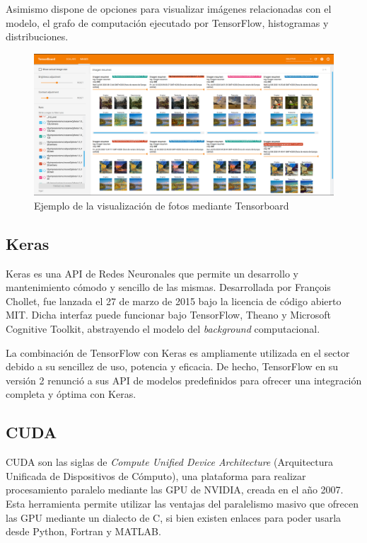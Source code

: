 \documentclass[../main.tex]{subfiles}
\begin{document}
Asimismo dispone de opciones para visualizar imágenes relacionadas con el modelo, el grafo de computación ejecutado por TensorFlow, histogramas y distribuciones.

\begin{figure}[h!]
    \centering
    \includegraphics[width=1\textwidth]{imagenes/Tensorboard_imagen_resumen.png}
    \caption{Ejemplo de la visualización de fotos mediante Tensorboard}
    \label{fig:tensorboard_descripcion_imagenes}
\end{figure}

\subsection{Keras}
Keras es una API de Redes Neuronales que permite un desarrollo y mantenimiento cómodo y sencillo de las mismas. Desarrollada por François Chollet, fue lanzada el 27 de marzo de 2015 bajo la licencia de código abierto MIT. Dicha interfaz puede funcionar bajo TensorFlow, Theano y Microsoft Cognitive Toolkit, abstrayendo el modelo del \textit{background} computacional.
\newline

La combinación de TensorFlow con Keras es ampliamente utilizada en el sector debido a su sencillez de uso, potencia y eficacia. De hecho, TensorFlow en su versión 2 renunció a sus API de modelos predefinidos para ofrecer una integración completa y óptima con Keras.

\subsection{CUDA}

CUDA son las siglas de \textit{Compute Unified Device Architecture} (Arquitectura Unificada de Dispositivos de Cómputo), una plataforma para realizar procesamiento paralelo mediante las GPU de NVIDIA, creada en el año 2007. Esta herramienta permite utilizar las ventajas del paralelismo masivo que ofrecen las GPU mediante un dialecto de C, si bien existen enlaces para poder usarla desde Python, Fortran y MATLAB.
\newline
\end{document}
